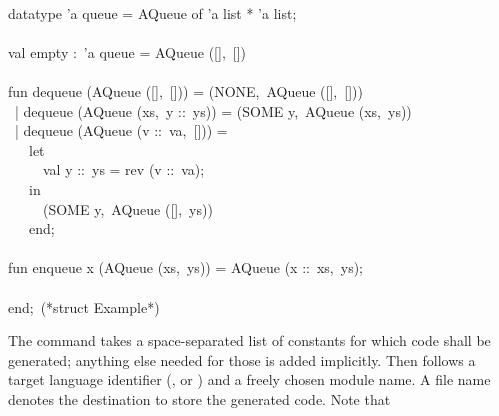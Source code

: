 \begin{isabellebody}
\begin{isamarkuptext}
\hspace*{0pt}\\
\hspace*{0pt}datatype 'a queue = AQueue of 'a list * 'a list;\\
\hspace*{0pt}\\
\hspace*{0pt}val empty :~'a queue = AQueue ([],~[])\\
\hspace*{0pt}\\
\hspace*{0pt}fun dequeue (AQueue ([],~[])) = (NONE,~AQueue ([],~[]))\\
\hspace*{0pt} ~| dequeue (AQueue (xs,~y ::~ys)) = (SOME y,~AQueue (xs,~ys))\\
\hspace*{0pt} ~| dequeue (AQueue (v ::~va,~[])) =\\
\hspace*{0pt} ~~~let\\
\hspace*{0pt} ~~~~~val y ::~ys = rev (v ::~va);\\
\hspace*{0pt} ~~~in\\
\hspace*{0pt} ~~~~~(SOME y,~AQueue ([],~ys))\\
\hspace*{0pt} ~~~end;\\
\hspace*{0pt}\\
\hspace*{0pt}fun enqueue x (AQueue (xs,~ys)) = AQueue (x ::~xs,~ys);\\
\hspace*{0pt}\\
\hspace*{0pt}end;~(*struct Example*)%
\end{isamarkuptext}%
\isamarkuptrue%
%
\endisatagquote
{\isafoldquote}%
%
\isadelimquote
%
\endisadelimquote
%
\begin{isamarkuptext}%
\noindent The \hyperlink{command.export-code}{\mbox{}} command takes a space-separated list of
  constants for which code shall be generated;  anything else needed for those
  is added implicitly.  Then follows a target language identifier
  (,  or ) and a freely chosen module name.
  A file name denotes the destination to store the generated code.  Note that

\end{isamarkuptext}
\end{isabellebody}
